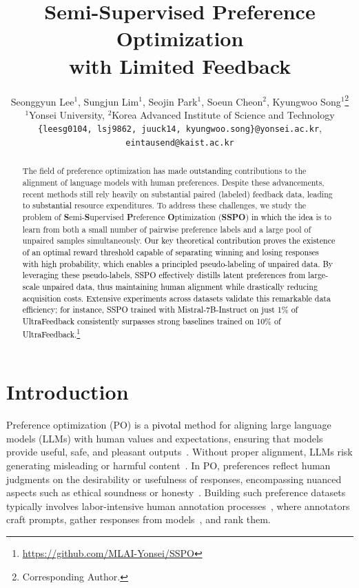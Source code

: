 \documentclass{article} %
\title{Semi-Supervised Preference Optimization \\with Limited Feedback}
\author{Seonggyun Lee$^1$, Sungjun Lim$^1$, Seojin Park$^1$, Soeun Cheon$^2$, Kyungwoo Song$^{1}$\thanks{Corresponding Author.} \\
$^1$Yonsei University, $^2$Korea Advanced Institute of Science and Technology \\
\texttt{\{leesg0104, lsj9862, juuck14, kyungwoo.song\}@yonsei.ac.kr}, \\
\texttt{eintausend@kaist.ac.kr}}
\newcommand\fix[1]{\textcolor{black}{#1}}
\newcommand\turnitin[1]{\textcolor{black}{#1}}
\newcommand\rebuttal[1]{\textcolor{black}{#1}}
\begin{document}
\maketitle


\begin{abstract}
The field of preference optimization has made \turnitin{outstanding} contributions to the alignment of language models with human preferences. Despite these advancements, recent methods still rely heavily on substantial paired (labeled) feedback data, leading to \turnitin{substantial} resource expenditures. To address these challenges, we study the problem of \textbf{S}emi-\textbf{S}upervised \textbf{P}reference \textbf{O}ptimization (\textbf{SSPO}) \turnitin{in which the idea} is to learn from both a small number of pairwise preference labels and a large pool of unpaired samples simultaneously. \fix{Our key theoretical contribution proves the existence of an optimal reward threshold capable of separating winning and losing responses with high probability, which enables a principled pseudo-labeling of unpaired data. By leveraging these pseudo-labels, SSPO effectively distills latent preferences from large-scale unpaired data, thus maintaining human alignment while drastically reducing acquisition costs. Extensive experiments across datasets validate this remarkable data efficiency; for instance, SSPO trained with \rebuttal{Mistral-7B-Instruct} on just 1\% of UltraFeedback consistently surpasses strong baselines trained on 10\% of UltraFeedback.}\footnote{\url{https://github.com/MLAI-Yonsei/SSPO}}
\end{abstract}

\vspace{-3mm}
\section{Introduction}
\vspace{-1mm}

Preference optimization (PO) is a \turnitin{pivotal} method for aligning large language models (LLMs) with human values and expectations, ensuring that models provide useful, safe, and pleasant outputs~\citep{calandriello2024humanalignmentlargelanguage}. Without proper alignment, LLMs risk generating misleading or harmful content~\citep{song2024preferencerankingoptimizationhuman}. In PO, preferences reflect human judgments on the desirability or usefulness of responses, encompassing nuanced aspects such as ethical soundness or honesty~\citep{christiano2017deep, ouyang2022traininglanguagemodelsfollow, bai2022traininghelpfulharmlessassistant}. Building such preference datasets typically involves labor-intensive human annotation processes~\citep{cui2024ultrafeedbackboostinglanguagemodels, karthik2024scalablerankedpreferenceoptimization, shi2024saferinstructaligninglanguagemodels}, where annotators craft prompts, gather responses from models~\citep{achiam2023gpt, dubey2024llama}, and rank them.
\end{document}
